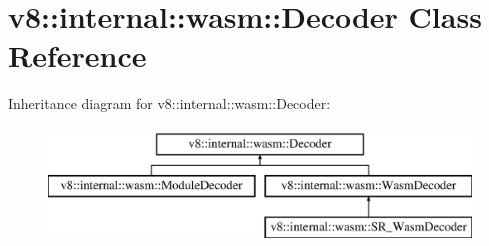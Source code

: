 \hypertarget{classv8_1_1internal_1_1wasm_1_1_decoder}{}\section{v8\+:\+:internal\+:\+:wasm\+:\+:Decoder Class Reference}
\label{classv8_1_1internal_1_1wasm_1_1_decoder}
Inheritance diagram for v8\+:\+:internal\+:\+:wasm\+:\+:Decoder\+:\begin{figure}[H]
\begin{center}
\leavevmode
\includegraphics[height=3.000000cm]{classv8_1_1internal_1_1wasm_1_1_decoder}
\end{center}
\end{figure}
